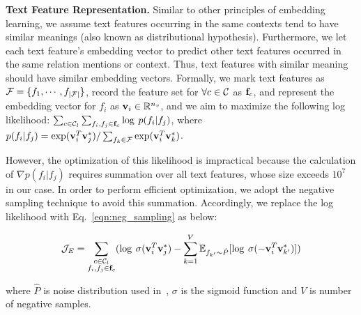 \smallskip
\noindent
\textsf{\textbf{\small Text Feature Representation. }} 
Similar to other principles of embedding learning, we assume text features occurring in the same contexts tend to have similar meanings (also known as distributional hypothesis\cite{harris1954distributional}). Furthermore, we let each text feature's embedding vector to predict other text features occurred in the same relation mentions or context. Thus, text features with similar meaning should have similar
 embedding vectors. Formally, we mark text features as $\mathcal{F} = \{f_1, \cdots, f_{|\mathcal{F}|}\}$, record the feature set for $\forall c \in \mathcal{C}$ as $\mathbf{f}_c$, and represent the embedding vector for $f_i$ as $\mathbf{v}_i \in \mathbb{R}^{n_v}$, and we aim to maximize the following log likelihood: {\small $\sum_{c \in \mathcal{C}_l} \sum_{f_i, f_j \in \mathbf{f}_c} \log \: p(f_i | f_j)$}, where {\small $p(f_i | f_j) = \exp(\mathbf{v}_i^T\mathbf{v}_j^*) / \sum_{f_k \in \mathcal{F}} \exp(\mathbf{v}_i^T \mathbf{v}_k^*)$}.

However, the optimization of this likelihood is impractical because the calculation of $\nabla p(f_i|f_j)$ requires summation over all text features, whose size exceeds $10^7$ in our case. 
In order to perform efficient optimization, we adopt the negative sampling technique \cite{mikolov2013distributed} to avoid this summation. 
Accordingly, we replace the log likelihood with Eq.~\ref{eqn:neg_sampling} as below:

\begin{small}
\begin{equation}
\mathcal{J}_E = \sum_{\substack{c \in \mathcal{C}_l \\ f_i,f_j\in \mathbf{f}_c}} (\log \: \sigma(\mathbf{v}_i^T \mathbf{v}_j^*) - \sum_{k=1}^V \mathbb{E}_{f_{k'} \sim \hat{P}} [\log \: \sigma(-\mathbf{v}_i^T \mathbf{v}_{k'}^*)]) \label{eqn:neg_sampling}
\end{equation}
\end{small}
where $\hat{P}$ is noise distribution used in~\cite{mikolov2013distributed}, $\sigma$ is the sigmoid function and $V$ is number of negative samples.


